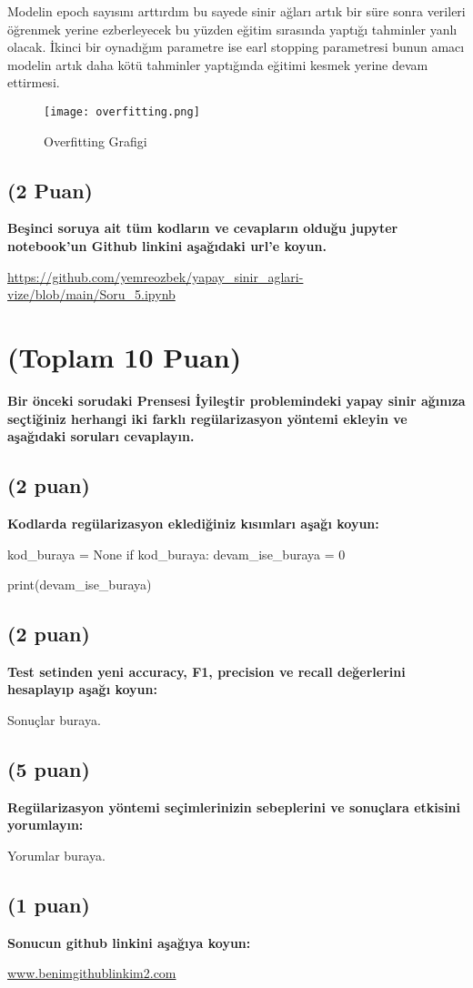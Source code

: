 \documentclass[11pt]{article}
\begin{document}
Modelin epoch sayısını arttırdım bu sayede sinir ağları artık bir süre sonra  verileri öğrenmek
yerine ezberleyecek bu yüzden eğitim sırasında yaptığı tahminler yanlı olacak. İkinci bir oynadığım parametre ise earl stopping parametresi bunun amacı modelin artık daha kötü tahminler yaptığında eğitimi kesmek yerine devam ettirmesi. 

\begin{figure}[ht!]
    \centering
    \texttt{[image: overfitting.png]}
    \caption{Overfitting Grafigi}
    \label{fig:my_pic3}
\end{figure}


\subsection{(2 Puan)} \textbf{Beşinci soruya ait tüm kodların ve cevapların olduğu jupyter notebook'un Github linkini aşağıdaki url'e koyun.}

\url{https://github.com/yemreozbek/yapay_sinir_aglari-vize/blob/main/Soru_5.ipynb}

\section{(Toplam 10 Puan)} \textbf{Bir önceki sorudaki Prensesi İyileştir problemindeki yapay sinir ağınıza seçtiğiniz herhangi iki farklı regülarizasyon yöntemi ekleyin ve aşağıdaki soruları cevaplayın.} 

\subsection{(2 puan)} \textbf{Kodlarda regülarizasyon eklediğiniz kısımları aşağı koyun:} 

\begin{python}
kod_buraya = None
if kod_buraya:
    devam_ise_buraya = 0

print(devam_ise_buraya)
\end{python}

\subsection{(2 puan)} \textbf{Test setinden yeni accuracy, F1, precision ve recall değerlerini hesaplayıp aşağı koyun:}

Sonuçlar buraya.

\subsection{(5 puan)} \textbf{Regülarizasyon yöntemi seçimlerinizin sebeplerini ve sonuçlara etkisini yorumlayın:}

Yorumlar buraya.

\subsection{(1 puan)} \textbf{Sonucun github linkini  aşağıya koyun:}

\url{www.benimgithublinkim2.com}
\end{document}
